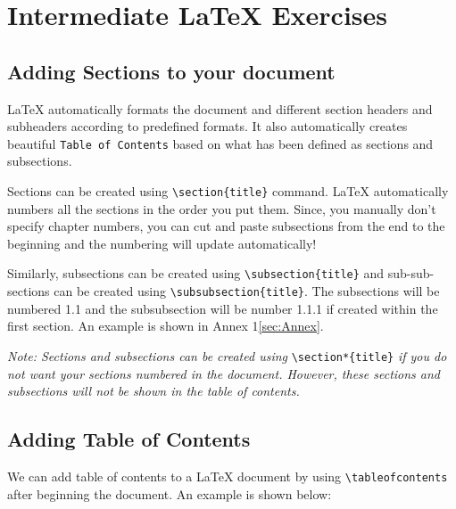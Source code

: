 \documentclass[12pts]{report}
\begin{document}
\section*{Intermediate {\LaTeX} Exercises}
\subsection*{Adding Sections to your document}
{\LaTeX} automatically formats the document and different section headers and subheaders according to predefined formats. It also automatically creates beautiful \texttt{Table of Contents} based on what has been defined as sections and subsections. 

Sections can be created using \verb|\section{title}| command. {\LaTeX} automatically numbers all the sections in the order you put them. Since, you manually don't specify chapter numbers, you can cut and paste subsections from the end to the beginning and the numbering will update automatically! 

Similarly, subsections can be created using \verb|\subsection{title}| and sub-sub-sections can be created using \verb|\subsubsection{title}|. The subsections will be numbered 1.1 and the subsubsection will be number 1.1.1 if created within the first section. An example is shown in Annex 1\ref{sec:Annex}. 

\textit{Note: Sections and subsections can be created using} \verb|\section*{title}| \textit{if you do not want your sections numbered in the document. However, these sections and subsections will not be shown in the table of contents.}
\subsection*{Adding Table of Contents}

We can add table of contents to a {\LaTeX} document by using \verb|\tableofcontents| after beginning the document.  An example is shown below:
\end{document}

